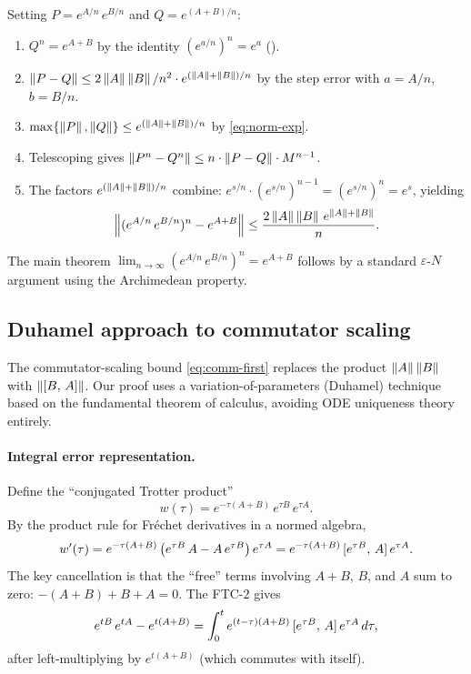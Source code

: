 Setting $P = e^{A/n}\,e^{B/n}$ and $Q = e^{(A+B)/n}$:
\begin{enumerate}
  \item $Q^n = e^{A+B}$ by the identity $(e^{a/n})^n = e^a$
    ().
  \item $\left\|P-Q\right\| \le 2\left\|A\right\|\left\|B\right\|/n^2 \cdot e^{(\left\|A\right\|+\left\|B\right\|)/n}$
    by the step error with $a = A/n$, $b = B/n$.
  \item $\max\{\left\|P\right\|,\left\|Q\right\|\} \le e^{(\left\|A\right\|+\left\|B\right\|)/n}$ by
    \eqref{eq:norm-exp}.
  \item Telescoping gives
    $\left\|P^n - Q^n\right\| \le n \cdot \left\|P-Q\right\| \cdot M^{n-1}$.
  \item The factors $e^{(\left\|A\right\|+\left\|B\right\|)/n}$ combine:
    $e^{s/n} \cdot (e^{s/n})^{n-1} = (e^{s/n})^n = e^s$, yielding
    \[
      \left\|(e^{A/n}\,e^{B/n})^n - e^{A+B}\right\|
        \le \frac{2\left\|A\right\|\left\|B\right\|\,e^{\left\|A\right\|+\left\|B\right\|}}{n}.
    \]
\end{enumerate}
The main theorem $\lim_{n\to\infty} (e^{A/n}\,e^{B/n})^n = e^{A+B}$ follows
by a standard $\varepsilon$-$N$ argument using the Archimedean property.

\subsection{Duhamel approach to commutator scaling}
\label{sec:commutator}

The commutator-scaling bound \eqref{eq:comm-first} replaces the product
$\left\|A\right\|\left\|B\right\|$ with $\left\|[B,\,A]\right\|$. Our proof uses a
variation-of-parameters (Duhamel) technique based on the fundamental theorem
of calculus, avoiding ODE uniqueness theory entirely.

\paragraph{Integral error representation.}
Define the ``conjugated Trotter product''
\begin{equation}\label{eq:w-def}
  w(\tau) = e^{-\tau(A+B)}\,e^{\tau B}\,e^{\tau A}.
\end{equation}
By the product rule for Fr\'{e}chet derivatives in a normed algebra,
\begin{equation}\label{eq:w-deriv}
  w'(\tau) = e^{-\tau(A+B)}\,\bigl(e^{\tau B}\,A - A\,e^{\tau B}\bigr)\,e^{\tau A}
  = e^{-\tau(A+B)}\,[e^{\tau B},\,A]\,e^{\tau A}.
\end{equation}
The key cancellation is that the ``free'' terms involving $A+B$, $B$, and $A$
sum to zero: $-(A+B) + B + A = 0$. The FTC-2 gives
\begin{equation}\label{eq:integral-error}
  e^{tB}\,e^{tA} - e^{t(A+B)}
    = \int_0^t e^{(t-\tau)(A+B)}\,[e^{\tau B},\,A]\,e^{\tau A}\,d\tau,
\end{equation}
after left-multiplying by $e^{t(A+B)}$ (which commutes with itself).

